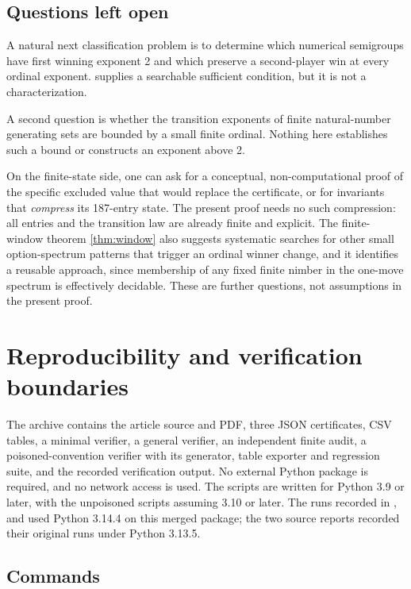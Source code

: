 \documentclass[11pt,letterpaper]{article}
\numberwithin{equation}{section}
\theoremstyle{definition}
\theoremstyle{remark}
\begin{document}
\subsection{Questions left open}

A natural next classification problem is to determine which numerical
semigroups have first winning exponent 2 and which preserve a
second-player win at every ordinal exponent. 
supplies a searchable sufficient condition, but it is not a
characterization.

A second question is whether the transition exponents of finite
natural-number generating sets are bounded by a small finite ordinal.
Nothing here establishes such a bound or constructs an exponent above 2.

On the finite-state side, one can ask for a conceptual, non-computational
proof of the specific excluded value that would replace the certificate,
or for invariants that \emph{compress} its 187-entry state. The present
proof needs no such compression: all entries and the transition law are
already finite and explicit. The finite-window theorem
\cref{thm:window} also suggests systematic searches for other small
option-spectrum patterns that trigger an ordinal winner change, and it
identifies a reusable approach, since membership of any fixed finite
nimber in the one-move spectrum is effectively decidable. These are
further questions, not assumptions in the present proof.

\section{Reproducibility and verification boundaries}\label{sec:reproduce}

The archive contains the article source and PDF, three JSON certificates,
CSV tables, a minimal verifier, a general verifier, an independent finite
audit, a poisoned-convention verifier with its generator, table exporter
and regression suite, and the recorded verification output. No external
Python package is required, and no network access is used. The scripts
are written for Python 3.9 or later, with the unpoisoned scripts
assuming 3.10 or later. The runs recorded in ,
 and 
used Python 3.14.4 on this merged package; the two source reports
recorded their original runs under Python 3.13.5.

\subsection{Commands}
\end{document}
